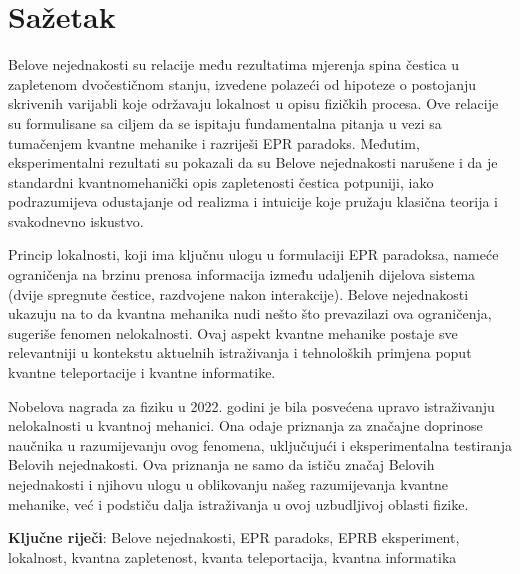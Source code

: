 \chapter*{Sažetak}
\sloppy

Belove nejednakosti su relacije među rezultatima mjerenja spina čestica u zapletenom dvočestičnom stanju, izvedene polazeći od hipoteze o postojanju skrivenih varijabli koje održavaju lokalnost u opisu fizičkih procesa.
Ove relacije su formulisane sa ciljem da se ispitaju fundamentalna pitanja u vezi sa tumačenjem kvantne mehanike i razriješi EPR paradoks.
Međutim, eksperimentalni rezultati su pokazali da su Belove nejednakosti narušene i da je standardni kvantnomehanički opis zapletenosti čestica potpuniji, iako podrazumijeva odustajanje od realizma i intuicije
koje pružaju klasična teorija i svako\-dnevno iskustvo.

Princip lokalnosti, koji ima ključnu ulogu u formulaciji EPR paradoksa,
nameće ograničenja na brzinu prenosa informacija između udaljenih dijelova sistema (dvije spregnute čestice, razdvojene nakon interakcije). Belove nejednakosti ukazuju na to da kvantna mehanika nudi nešto što prevazilazi ova ograničenja, sugeriše fenomen nelokalnosti. Ovaj aspekt kvantne mehanike postaje sve relevantniji u kontekstu aktuelnih istraživanja i tehnoloških primjena poput kvantne teleportacije i kvantne informatike.

Nobelova nagrada za fiziku u 2022. godini je bila posvećena upravo istraživanju nelokalnosti u kvantnoj mehanici. Ona odaje priznanja za značajne doprinose naučnika u razumijevanju ovog fenomena, uključujući i eksperimentalna testiranja Belovih nejednakosti. Ova priznanja ne samo da ističu značaj Belovih nejednakosti i njihovu ulogu u oblikovanju našeg razumijevanja kvantne mehanike, već i podstiču dalja istraživanja u ovoj uzbudljivoj oblasti fizike.

{\textbf{Ključne riječi}}: Belove nejednakosti, EPR paradoks, EPRB eksperiment, lokalnost, kvantna zapletenost, kvanta teleportacija, kvantna informatika